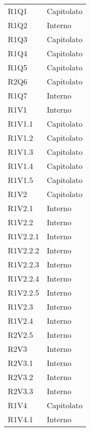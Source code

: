 \begin{longtable} {
			>{\centering}p{28mm}  
			>{}p{20mm}
		}
		R1Q1 & Capitolato \TBstrut \\ [2mm]
		R1Q2 & Interno \TBstrut \\ [2mm]
		R1Q3 & Capitolato \TBstrut \\ [2mm]
		R1Q4 & Capitolato \TBstrut \\ [2mm]
		R1Q5 & Capitolato \TBstrut \\ [2mm]
		R2Q6 & Capitolato \TBstrut \\ [2mm]
		R1Q7 & Interno \TBstrut \\ [2mm]
		
		R1V1 & Interno \TBstrut \\ [2mm]
		R1V1.1 & Capitolato \TBstrut \\ [2mm]
		R1V1.2 & Capitolato \TBstrut \\ [2mm]
		R1V1.3 & Capitolato \TBstrut \\ [2mm]
		R1V1.4 & Capitolato \TBstrut \\ [2mm]
		R1V1.5 & Capitolato \TBstrut \\ [2mm]
		R1V2 & Capitolato \TBstrut \\ [2mm]
		R1V2.1 & Interno \TBstrut \\ [2mm]
		R1V2.2 & Interno \TBstrut \\ [2mm]
		R1V2.2.1 & Interno \TBstrut \\ [2mm]
		R1V2.2.2 & Interno \TBstrut \\ [2mm]
		R1V2.2.3 & Interno \TBstrut \\ [2mm]
		R1V2.2.4 & Interno \TBstrut \\ [2mm]
		R1V2.2.5 & Interno \TBstrut \\ [2mm]
		R1V2.3 & Interno \TBstrut \\ [2mm]
		R1V2.4 & Interno \TBstrut \\ [2mm]
		R2V2.5 & Interno \TBstrut \\ [2mm]
		R2V3 & Interno \TBstrut \\ [2mm]
		R2V3.1 & Interno  \TBstrut \\ [2mm]		
		R2V3.2 & Interno  \TBstrut \\ [2mm]		
		R2V3.3 & Interno  \TBstrut \\ [2mm]		
		R1V4 & Capitolato  \TBstrut \\ [2mm]		
		R1V4.1 & Interno  \TBstrut \\ [2mm]
	\end{longtable}